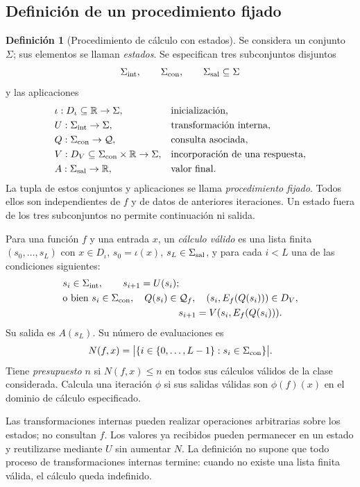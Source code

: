 \documentclass[11pt,a4paper]{article}
\numberwithin{equation}{section}
\theoremstyle{definition}
\newtheorem{definition}[theorem]{Definición}
\theoremstyle{remark}
\newcommand{\R}{\mathbb R}
\newcommand{\QQ}{\mathcal Q}
\begin{document}
\subsection{Definición de un procedimiento fijado}
\begin{definition}[Procedimiento de cálculo con estados]\label{def:procedure}
Se considera un conjunto $\Sigma$; sus elementos se llaman \emph{estados}. Se especifican tres subconjuntos disjuntos
\[
\Sigma_{\rm int},\qquad\Sigma_{\rm con},\qquad\Sigma_{\rm sal}\subseteq\Sigma
\]
y las aplicaciones
\begin{align*}
&\iota:D_\iota\subseteq\R\to\Sigma, &&\text{inicialización},\\
&U:\Sigma_{\rm int}\to\Sigma, &&\text{transformación interna},\\
&Q:\Sigma_{\rm con}\to\QQ, &&\text{consulta asociada},\\
&V:D_V\subseteq\Sigma_{\rm con}\times\R\to\Sigma, &&\text{incorporación de una respuesta},\\
&A:\Sigma_{\rm sal}\to\R, &&\text{valor final}.
\end{align*}
La tupla de estos conjuntos y aplicaciones se llama \emph{procedimiento fijado}. Todos ellos son independientes de $f$ y de datos de anteriores iteraciones. Un estado fuera de los tres subconjuntos no permite continuación ni salida.

Para una función $f$ y una entrada $x$, un \emph{cálculo válido} es una lista finita $(s_0,\ldots,s_L)$ con $x\in D_\iota$, $s_0=\iota(x)$, $s_L\in\Sigma_{\rm sal}$, y para cada $i<L$ una de las condiciones siguientes:
\begin{align*}
&s_i\in\Sigma_{\rm int},\qquad s_{i+1}=U(s_i);\\
&\text{o bien }s_i\in\Sigma_{\rm con},\quad Q(s_i)\in\QQ_f,\quad
(s_i,E_f(Q(s_i)))\in D_V,\\
&\hspace{42mm}s_{i+1}=V(s_i,E_f(Q(s_i))).
\end{align*}
Su salida es $A(s_L)$. Su número de evaluaciones es
\[
N(f,x)=\bigl|\{i\in\{0,\ldots,L-1\}:s_i\in\Sigma_{\rm con}\}\bigr|.
\]
Tiene \emph{presupuesto $n$} si $N(f,x)\le n$ en todos sus cálculos válidos de la clase considerada. Calcula una iteración $\phi$ si sus salidas válidas son $\phi(f)(x)$ en el dominio de cálculo especificado.
\end{definition}

Las transformaciones internas pueden realizar operaciones arbitrarias sobre los estados; no consultan $f$. Los valores ya recibidos pueden permanecer en un estado y reutilizarse mediante $U$ sin aumentar $N$. La definición no supone que todo proceso de transformaciones internas termine: cuando no existe una lista finita válida, el cálculo queda indefinido.
\end{document}

